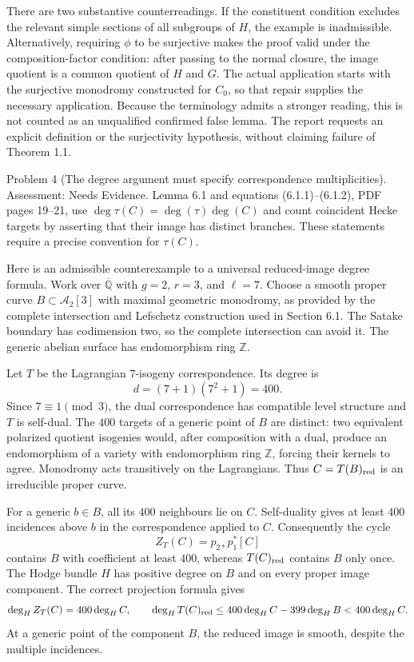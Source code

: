 \documentclass[10pt]{article}
\begin{document}
There are two substantive counterreadings. If the constituent condition excludes the relevant simple sections of all subgroups of \(H\), the example is inadmissible. Alternatively, requiring \(\phi\) to be surjective makes the proof valid under the composition-factor condition: after passing to the normal closure, the image quotient is a common quotient of \(H\) and \(G\). The actual application starts with the surjective monodromy constructed for \(C_0\), so that repair supplies the necessary application. Because the terminology admits a stronger reading, this is not counted as an unqualified confirmed false lemma. The report requests an explicit definition or the surjectivity hypothesis, without claiming failure of Theorem 1.1.\par
Problem 4 (The degree argument must specify correspondence multiplicities).  Assessment: Needs Evidence. Lemma 6.1 and equations (6.1.1)–(6.1.2), PDF pages 19–21, use \(\deg\tau(C)=\deg(\tau)\deg(C)\) and count coincident Hecke targets by asserting that their image has distinct branches. These statements require a precise convention for \(\tau(C)\).\par
Here is an admissible counterexample to a universal reduced-image degree formula. Work over \(\overline{\mathbb Q}\) with \(g=2\), \(r=3\), and \(\ell=7\). Choose a smooth proper curve \(B\subset\mathcal A_2[3]\) with maximal geometric monodromy, as provided by the complete intersection and Lefschetz construction used in Section 6.1. The Satake boundary has codimension two, so the complete intersection can avoid it. The generic abelian surface has endomorphism ring \(\mathbb Z\).\par
Let \(T\) be the Lagrangian \(7\)-isogeny correspondence. Its degree is \[d=(7+1)(7^2+1)=400.\] Since \(7\equiv1\pmod3\), the dual correspondence has compatible level structure and \(T\) is self-dual. The \(400\) targets of a generic point of \(B\) are distinct: two equivalent polarized quotient isogenies would, after composition with a dual, produce an endomorphism of a variety with endomorphism ring \(\mathbb Z\), forcing their kernels to agree. Monodromy acts transitively on the Lagrangians. Thus \(C=T(B)_{\rm red}\) is an irreducible proper curve.\par
For a generic \(b\in B\), all its \(400\) neighbours lie on \(C\). Self-duality gives at least \(400\) incidences above \(b\) in the correspondence applied to \(C\). Consequently the cycle \[Z_T(C)=p_{2*}p_1^*[C]\] contains \(B\) with coefficient at least \(400\), whereas \(T(C)_{\rm red}\) contains \(B\) only once. The Hodge bundle \(H\) has positive degree on \(B\) and on every proper image component. The correct projection formula gives \[\deg_H Z_T(C)=400\deg_H C,\qquad
 \deg_H T(C)_{\rm red}
       \leq400\deg_H C-399\deg_H B<400\deg_H C.\] At a generic point of the component \(B\), the reduced image is smooth, despite the multiple incidences.\par
\end{document}
